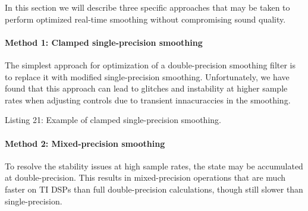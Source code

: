 In this section we will describe three specific approaches that may be taken to perform optimized real-\/time smoothing without compromising sound quality.

\hypertarget{a00832_subsubsection__method_1_clamped_singleprecision_smoothing_}{}\paragraph{Method 1\+: Clamped single-\/precision smoothing}\label{a00832_subsubsection__method_1_clamped_singleprecision_smoothing_}
 The simplest approach for optimization of a double-\/precision smoothing filter is to replace it with modified single-\/precision smoothing. Unfortunately, we have found that this approach can lead to glitches and instability at higher sample rates when adjusting controls due to transient innacuraccies in the smoothing.


\begin{DoxyCode}{0}
\DoxyCodeLine{}
\DoxyCodeLine{\textcolor{comment}{// Method 1 - single - precision}}
\DoxyCodeLine{\{}
\DoxyCodeLine{}
\DoxyCodeLine{    \textcolor{comment}{// If the de -zip step is so small that the coefficient doesn't change then clamp}}
\DoxyCodeLine{    \textcolor{comment}{// the value to the target to ensure we are using exactly the desired value .}}
\DoxyCodeLine{\} }
\end{DoxyCode}
  Listing 21\+: Example of clamped single-\/precision smoothing.

\hypertarget{a00832_subsubsection__method_2_mixedprecision_smoothing_}{}\paragraph{Method 2\+: Mixed-\/precision smoothing}\label{a00832_subsubsection__method_2_mixedprecision_smoothing_}
 To resolve the stability issues at high sample rates, the state may be accumulated at double-\/precision. This results in mixed-\/precision operations that are much faster on TI D\+S\+Ps than full double-\/precision calculations, though still slower than single-\/precision.


